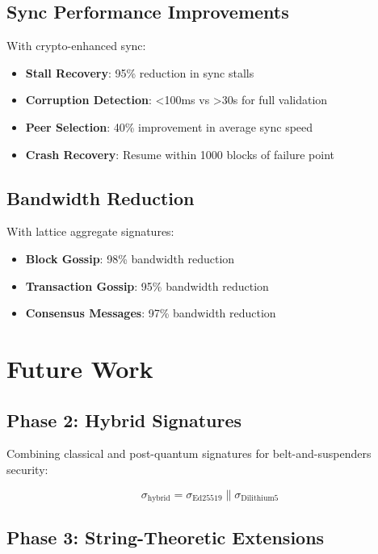 \documentclass[11pt,a4paper]{article}
\begin{document}
\subsection{Sync Performance Improvements}

With crypto-enhanced sync:

\begin{itemize}
    \item \textbf{Stall Recovery}: 95\% reduction in sync stalls
    \item \textbf{Corruption Detection}: <100ms vs >30s for full validation
    \item \textbf{Peer Selection}: 40\% improvement in average sync speed
    \item \textbf{Crash Recovery}: Resume within 1000 blocks of failure point
\end{itemize}

\subsection{Bandwidth Reduction}

With lattice aggregate signatures:

\begin{itemize}
    \item \textbf{Block Gossip}: 98\% bandwidth reduction
    \item \textbf{Transaction Gossip}: 95\% bandwidth reduction
    \item \textbf{Consensus Messages}: 97\% bandwidth reduction
\end{itemize}

\section{Future Work}

\subsection{Phase 2: Hybrid Signatures}

Combining classical and post-quantum signatures for belt-and-suspenders security:

\[
\sigma_{\text{hybrid}} = \sigma_{\text{Ed25519}} \| \sigma_{\text{Dilithium5}}
\]

\subsection{Phase 3: String-Theoretic Extensions}
\end{document}
